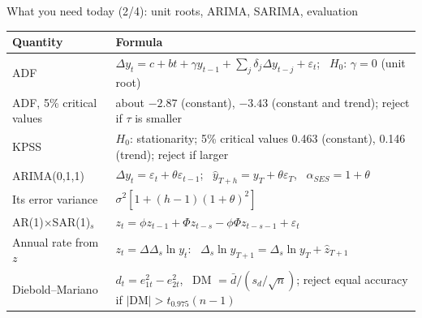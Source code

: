 \begin{frame}{What you need today (2/4): unit roots, ARIMA, SARIMA, evaluation}
\itemsize{\small}
{\renewcommand{\arraystretch}{1.3}\begin{center}
\footnotesize
\begin{tabular}{l>{\raggedright\arraybackslash}p{9.4cm}}
\toprule
\textbf{Quantity} & \textbf{Formula} \\
\midrule
ADF & $\Delta y_t = c + bt + \gamma y_{t-1} + \sum_j\delta_j\Delta y_{t-j} + \varepsilon_t$; \ $H_0$: $\gamma = 0$ (unit root) \\
ADF, 5\% critical values & about $-2.87$ (constant), $-3.43$ (constant and trend); reject if $\tau$ is smaller \\
KPSS & $H_0$: stationarity; 5\% critical values 0.463 (constant), 0.146 (trend); reject if larger \\
ARIMA(0,1,1) & $\Delta y_t = \varepsilon_t + \theta\varepsilon_{t-1}$; \ $\hat y_{T+h} = y_T + \theta\varepsilon_T$, \ $\alpha_{SES} = 1 + \theta$ \\
Its error variance & $\sigma^2[1 + (h - 1)(1 + \theta)^2]$ \\
AR(1)$\times$SAR(1)$_s$ & $z_t = \phi z_{t-1} + \Phi z_{t-s} - \phi\Phi z_{t-s-1} + \varepsilon_t$ \\
Annual rate from $z$ & $z_t = \Delta\Delta_s\ln y_t$: \ $\Delta_s\ln y_{T+1} = \Delta_s\ln y_T + \hat z_{T+1}$ \\
Diebold--Mariano & $d_t = e_{1t}^2 - e_{2t}^2$, \ DM $= \bar d/(s_d/\sqrt{n})$; reject equal accuracy if $|\mathrm{DM}| > t_{0.975}(n - 1)$ \\
\bottomrule
\end{tabular}
\end{center}
}
\end{frame}

